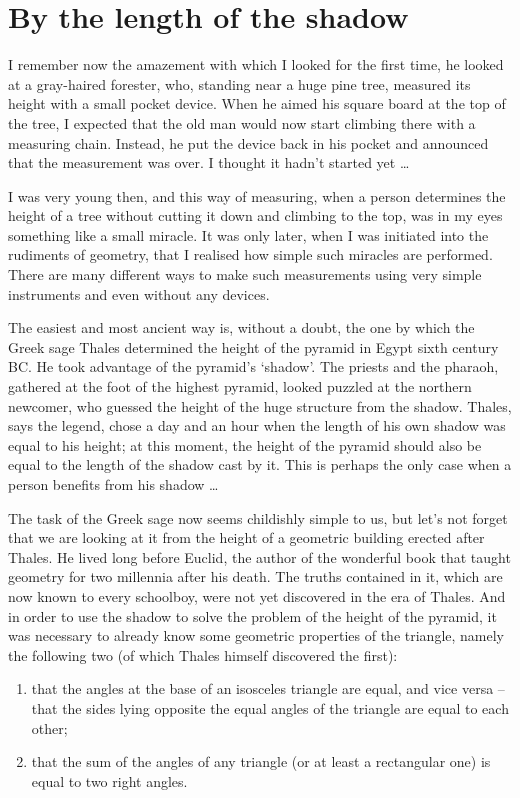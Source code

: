 \section{By the length of the shadow}
\label{sec-1.1}

I remember now the amazement with which I looked for the first time, he looked at a gray-haired forester, who, standing near a huge pine tree, measured its height with a small pocket device. When he aimed his square board at the top of the tree, I expected that the old man would now start climbing there with a measuring chain. Instead, he put the device back in his pocket and announced that the measurement was over. I thought it hadn't started yet \ldots{}

I was very young then, and this way of measuring, when a person determines the height of a tree without cutting it down and climbing to the top, was in my eyes something like a small miracle. It was only later, when I was initiated into the rudiments of geometry, that I realised how simple such miracles are performed. There are many different ways to make such measurements using very simple instruments and even without any devices.

The easiest and most ancient way is, without a doubt, the one by which the Greek sage Thales determined the height of the pyramid in Egypt sixth century BC. He took advantage of the pyramid's `shadow'. The priests and the pharaoh, gathered at the foot of the highest pyramid, looked puzzled at the northern newcomer, who guessed the height of the huge structure from the shadow. Thales, says the legend, chose a day and an hour when the length of his own shadow was equal to his height; at this moment, the height of the pyramid should also be equal to the length of the shadow cast by it. This is perhaps the only case when a person benefits from his shadow \ldots{}

The task of the Greek sage now seems childishly simple to us, but let's not forget that we are looking at it from the height of a geometric building erected after Thales. He lived long before Euclid, the author of the wonderful book that taught geometry for two millennia after his death. The truths contained in it, which are now known to every schoolboy, were not yet discovered in the era of Thales. And in order to use the shadow to solve the problem of the height of the pyramid, it was necessary to already know some geometric properties of the triangle, namely the following two (of which Thales himself discovered the first):
\begin{enumerate}
\item that the angles at the base of an isosceles triangle are equal, and vice versa -- that the sides lying opposite the equal angles of the triangle are equal to each other;
\item that the sum of the angles of any triangle (or at least a rectangular one) is equal to two right angles.
\end{enumerate}


